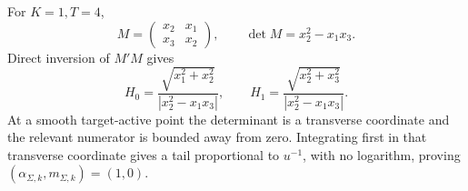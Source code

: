 For \(K=1,T=4\),
\[
M=\begin{pmatrix}x_2&x_1\\x_3&x_2\end{pmatrix},
\qquad \det M=x_2^2-x_1x_3.
\]
Direct inversion of \(M'M\) gives
\[
H_0=\frac{\sqrt{x_1^2+x_2^2}}{|x_2^2-x_1x_3|},
\qquad
H_1=\frac{\sqrt{x_2^2+x_3^2}}{|x_2^2-x_1x_3|}.
\]
At a smooth target-active point the determinant is a transverse coordinate and the relevant numerator is bounded away from zero. Integrating first in that transverse coordinate gives a tail proportional to \(u^{-1}\), with no logarithm, proving \((\alpha_{\Sigma,k},m_{\Sigma,k})=(1,0)\).